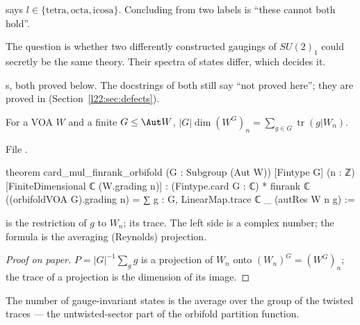 \begin{dictionary}
 says $l\in\{\mathrm{tetra},\mathrm{octa},\mathrm{icosa}\}$. Concluding  from two labels
is ``these cannot both hold''.
\end{dictionary}

\begin{physics}
The question is whether two differently constructed gaugings of $SU(2)_1$ could secretly be the same theory. Their
spectra of states differ, which decides it.
\end{physics}

\begin{status}
s, both proved below. The docstrings of both still say ``not proved here''; they are proved in
 (Section~\ref{l22:sec:defects}).
\end{status}

\begin{theorem}\label{l22:thm:molien}
For a VOA $W$ and a finite $G\le\Aut W$, $|G|\dim(W^G)_n=\sum_{g\in G}\operatorname{tr}(g|W_n)$.
\end{theorem}
\noindent File .
\begin{leancode}
theorem card_mul_finrank_orbifold (G : Subgroup (Aut W)) [Fintype G] (n : ℤ)
    [FiniteDimensional ℂ (W.grading n)] :
    (Fintype.card G : ℂ) * finrank ℂ ((orbifoldVOA G).grading n)
      = ∑ g : G, LinearMap.trace ℂ _ (autRes W n g) :=
\end{leancode}

\begin{dictionary}
 is the restriction of $g$ to $W_n$;  its trace. The left side is a
complex number; the formula is the averaging (Reynolds) projection.
\end{dictionary}

\begin{proof}[Proof on paper]
$P=|G|^{-1}\sum_g g$ is a projection of $W_n$ onto $(W_n)^G=(W^G)_n$; the trace of a projection is the dimension of its
image.
\end{proof}

\begin{physics}
The number of gauge-invariant states is the average over the group of the twisted traces --- the untwisted-sector
part of the orbifold partition function.
\end{physics}

